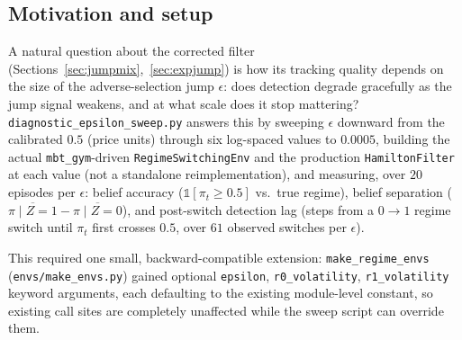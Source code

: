 \documentclass[11pt]{article}
\begin{document}
\subsection{Motivation and setup}
A natural question about the corrected filter (Sections~\ref{sec:jumpmix},~\ref{sec:expjump}) is how its tracking quality depends on the size of the adverse-selection jump $\epsilon$: does detection degrade gracefully as the jump signal weakens, and at what scale does it stop mattering? \texttt{diagnostic\_epsilon\_sweep.py} answers this by sweeping $\epsilon$ downward from the calibrated $0.5$ (price units) through six log-spaced values to $0.0005$, building the actual \texttt{mbt\_gym}-driven \texttt{RegimeSwitchingEnv} and the production \texttt{HamiltonFilter} at each value (not a standalone reimplementation), and measuring, over $20$ episodes per $\epsilon$: belief accuracy ($\mathbb{1}[\pi_t\ge0.5]$ vs.\ true regime), belief separation ($\overline{\pi\mid Z{=}1} - \overline{\pi\mid Z{=}0}$), and post-switch detection lag (steps from a $0{\to}1$ regime switch until $\pi_t$ first crosses $0.5$, over $61$ observed switches per $\epsilon$).

This required one small, backward-compatible extension: \texttt{make\_regime\_envs} (\texttt{envs/make\_envs.py}) gained optional \texttt{epsilon}, \texttt{r0\_volatility}, \texttt{r1\_volatility} keyword arguments, each defaulting to the existing module-level constant, so existing call sites are completely unaffected while the sweep script can override them.
\end{document}
